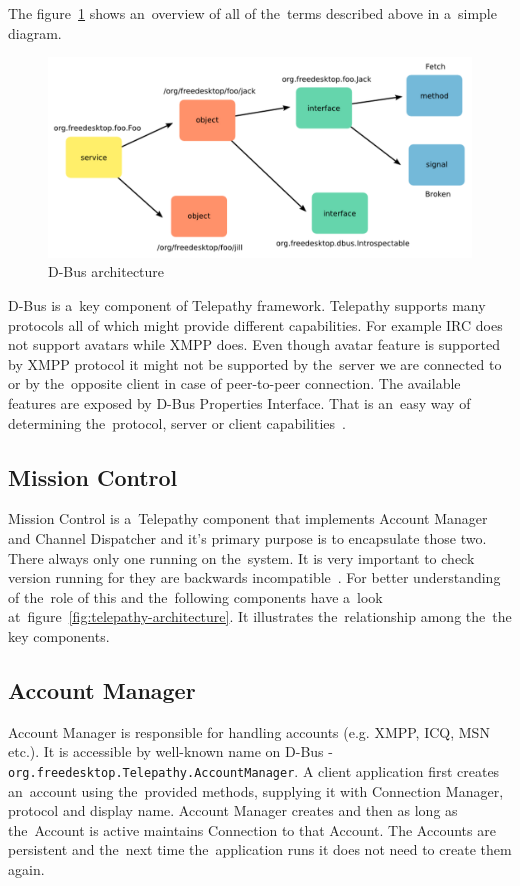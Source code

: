 The figure~\ref{fig:dbusArchitecture} shows an~overview of all of the~terms described above in a~simple diagram.

\begin{figure}[ht]
\begin{center}
	\includegraphics[width=15cm]{fig/dbus-architecture-overview.png}
	\caption{D-Bus architecture~\cite{TPWiki}}
	\label{fig:dbusArchitecture}
\end{center}
\end{figure}

D-Bus is a~key component of Telepathy framework. Telepathy supports many protocols all of which might provide different capabilities. For example IRC does not support avatars while XMPP does. Even though avatar feature is supported by XMPP protocol it might not be supported by the~server we are connected to or by the~opposite client in case of peer-to-peer connection. The available features are exposed by D-Bus Properties Interface. That is an~easy way of determining the~protocol, server or client capabilities~\cite{dbus}.

\subsection*{Mission Control}
Mission Control is a~Telepathy component that implements Account Manager and Channel Dispatcher and it's primary purpose is to encapsulate those two. There always only one running on the~system. It is very important to check version running for they are backwards incompatible~\cite{TPWiki}. For better understanding of the~role of this and the~following components have a~look at~figure~\ref{fig:telepathy-architecture}. It illustrates the~relationship among the~the key components.

\subsection*{Account Manager}
Account Manager is responsible for handling accounts (e.g. XMPP, ICQ, MSN etc.). It is accessible by well-known name on D-Bus - \verb|org.freedesktop.Telepathy.AccountManager|. A client application first creates an~account using the~provided methods, supplying it with Connection Manager, protocol and display name. Account Manager creates and then as long as the~Account is active maintains Connection to that Account. The Accounts are persistent and the~next time the~application runs it does not need to create them again. 


